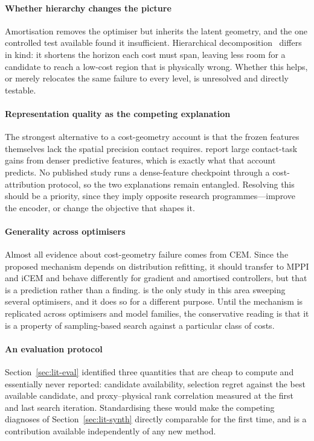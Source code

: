 \documentclass[11pt,letterpaper]{article}
\begin{document}
\paragraph{Whether hierarchy changes the picture}
Amortisation removes the optimiser but inherits the latent geometry, and the one
controlled test available found it insufficient. Hierarchical
decomposition~\citep{zhang2026hwm} differs in kind: it shortens the horizon each
cost must span, leaving less room for a candidate to reach a low-cost region that
is physically wrong. Whether this helps, or merely relocates the same failure to
every level, is unresolved and directly testable.

\paragraph{Representation quality as the competing explanation}
The strongest alternative to a cost-geometry account is that the frozen features
themselves lack the spatial precision contact requires.
\citet{murlabadia2026vjepa21} report large contact-task gains from denser
predictive features, which is exactly what that account predicts. No published
study runs a dense-feature checkpoint through a cost-attribution protocol, so the
two explanations remain entangled. Resolving this should be a priority, since
they imply opposite research programmes---improve the encoder, or change the
objective that shapes it.

\paragraph{Generality across optimisers}
Almost all evidence about cost-geometry failure comes from CEM. Since the
proposed mechanism depends on distribution refitting, it should transfer to MPPI
and iCEM and behave differently for gradient and amortised controllers, but that
is a prediction rather than a finding. \citet{nguyen2026latentgeometry} is the
only study in this area sweeping several optimisers, and it does so for a
different purpose. Until the mechanism is replicated across optimisers and model
families, the conservative reading is that it is a property of sampling-based
search against a particular class of costs.

\paragraph{An evaluation protocol}
Section~\ref{sec:lit-eval} identified three quantities that are cheap to compute
and essentially never reported: candidate availability, selection regret against
the best available candidate, and proxy--physical rank correlation measured at
the first and last search iteration. Standardising these would make the competing
diagnoses of Section~\ref{sec:lit-synth} directly comparable for the first time,
and is a contribution available independently of any new method.
\end{document}
